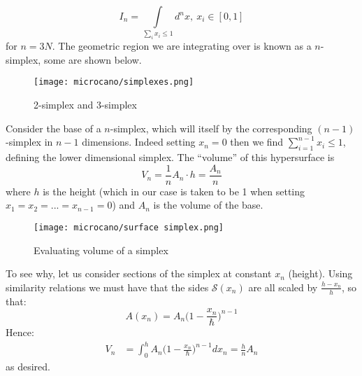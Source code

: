 \documentclass[a4paper,11pt,oneside]{book}
\begin{document}
\begin{equation}
    I_{n} = \int \limits_{\sum_i x_i \leq 1} d^n x, \ x_i \in [0,1]
\end{equation}
for $n=3N$. The geometric region we are integrating over is known as a $n$-simplex, some are shown below.
\begin{figure}[h!]
    \centering
    \texttt{[image: microcano/simplexes.png]}
    \caption{2-simplex and 3-simplex}
    \label{fig:my_label}
\end{figure}

Consider the base of a $n$-simplex, which will itself by the corresponding $(n-1)$-simplex in $n-1$ dimensions. Indeed setting $x_n=0$ then we find $\sum_{i=1}^{n-1} x_i \leq 1$, defining the lower dimensional simplex. The \enquote{volume} of this hypersurface is
\begin{equation}
    V_{n} = \frac{1}{n} A_n \cdot h = \frac{A_n}{n}
\end{equation}
where $h$ is the height (which in our case is taken to be 1 when setting $x_1=x_2=...=x_{n-1}=0$) and $A_n$ is the volume of the base. 

\begin{figure}[h!]
    \centering
    \texttt{[image: microcano/surface simplex.png]}
    \caption{Evaluating volume of a simplex}
    \label{fig:my_label}
\end{figure}
To see why, let us consider sections of the simplex at constant $x_n$ (height). Using similarity relations we must have that the sides $\mathcal{S}(x_n)$ are all scaled by $\frac{h-x_n}{h}$, so that:
\begin{equation}
    A(x_n) = A_n \bigg(1-\frac{x_n}{\hbar}\bigg)^{n-1}
\end{equation}
Hence:
\begin{align}
    V_n &= \int_0^h A_n\bigg(1-\frac{x_n}{\hbar}\bigg)^{n-1} dx_n=\frac{h}{n} A_n
\end{align}
as desired.
\end{document}

